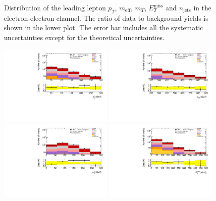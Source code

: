 \begin{figure}[htbp]
\begin{center}
\end{center}
\caption{Distribution of the  leading lepton $p_T$, $m_{\text{eff}}$, $m_T$, $E_{T}^{\text{miss}}$ and $n_{\text{jets}}$ in the electron-electron channel. The ratio of data to background yields is shown in the lower plot. The error bar includes all the systematic uncertainties except for the theoretical uncertainties.}
\label{fig:VRSS_fake_ee}
\end{figure}

\begin{figure}[htbp]
\includegraphics[width=0.49\textwidth]{data/plot/Fake_VR/pt1_VR_Fake_mumu}
\includegraphics[width=0.49\textwidth]{data/plot/Fake_VR/meff_VR_Fake_mumu}\\
\includegraphics[width=0.49\textwidth]{data/plot/Fake_VR/mt1_VR_Fake_mumu}
\includegraphics[width=0.49\textwidth]{data/plot/Fake_VR/MET_VR_Fake_mumu}\\

\end{figure}
